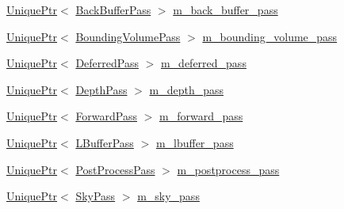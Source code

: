 \begin{DoxyCompactItemize}
\item 
\mbox{\hyperlink{namespacemage_a3316d7143a973e37adf1110f2e80ca31}{Unique\+Ptr}}$<$ \mbox{\hyperlink{classmage_1_1rendering_1_1_back_buffer_pass}{Back\+Buffer\+Pass}} $>$ \mbox{\hyperlink{classmage_1_1rendering_1_1_renderer_1_1_impl_aa030ca4a6167a0dead99172e922ae724}{m\+\_\+back\+\_\+buffer\+\_\+pass}}
\item 
\mbox{\hyperlink{namespacemage_a3316d7143a973e37adf1110f2e80ca31}{Unique\+Ptr}}$<$ \mbox{\hyperlink{classmage_1_1rendering_1_1_bounding_volume_pass}{Bounding\+Volume\+Pass}} $>$ \mbox{\hyperlink{classmage_1_1rendering_1_1_renderer_1_1_impl_adeb573b3a2780e7c8af6fda3e073f90b}{m\+\_\+bounding\+\_\+volume\+\_\+pass}}
\item 
\mbox{\hyperlink{namespacemage_a3316d7143a973e37adf1110f2e80ca31}{Unique\+Ptr}}$<$ \mbox{\hyperlink{classmage_1_1rendering_1_1_deferred_pass}{Deferred\+Pass}} $>$ \mbox{\hyperlink{classmage_1_1rendering_1_1_renderer_1_1_impl_acab2b5fe9403dd1a7643ae91e8a0433d}{m\+\_\+deferred\+\_\+pass}}
\item 
\mbox{\hyperlink{namespacemage_a3316d7143a973e37adf1110f2e80ca31}{Unique\+Ptr}}$<$ \mbox{\hyperlink{classmage_1_1rendering_1_1_depth_pass}{Depth\+Pass}} $>$ \mbox{\hyperlink{classmage_1_1rendering_1_1_renderer_1_1_impl_a6774962f06bc28a23ac7e34d8891bb24}{m\+\_\+depth\+\_\+pass}}
\item 
\mbox{\hyperlink{namespacemage_a3316d7143a973e37adf1110f2e80ca31}{Unique\+Ptr}}$<$ \mbox{\hyperlink{classmage_1_1rendering_1_1_forward_pass}{Forward\+Pass}} $>$ \mbox{\hyperlink{classmage_1_1rendering_1_1_renderer_1_1_impl_aa62d3e015ddcc7b48d423ad0e55a82d7}{m\+\_\+forward\+\_\+pass}}
\item 
\mbox{\hyperlink{namespacemage_a3316d7143a973e37adf1110f2e80ca31}{Unique\+Ptr}}$<$ \mbox{\hyperlink{classmage_1_1rendering_1_1_l_buffer_pass}{L\+Buffer\+Pass}} $>$ \mbox{\hyperlink{classmage_1_1rendering_1_1_renderer_1_1_impl_a82455409a99a11e84de943181138e33e}{m\+\_\+lbuffer\+\_\+pass}}
\item 
\mbox{\hyperlink{namespacemage_a3316d7143a973e37adf1110f2e80ca31}{Unique\+Ptr}}$<$ \mbox{\hyperlink{classmage_1_1rendering_1_1_post_process_pass}{Post\+Process\+Pass}} $>$ \mbox{\hyperlink{classmage_1_1rendering_1_1_renderer_1_1_impl_a243257571f0f32cdc401b73d9b39587c}{m\+\_\+postprocess\+\_\+pass}}
\item 
\mbox{\hyperlink{namespacemage_a3316d7143a973e37adf1110f2e80ca31}{Unique\+Ptr}}$<$ \mbox{\hyperlink{classmage_1_1rendering_1_1_sky_pass}{Sky\+Pass}} $>$ \mbox{\hyperlink{classmage_1_1rendering_1_1_renderer_1_1_impl_afc248fa0b293e9cbd2d0045c4caa7d26}{m\+\_\+sky\+\_\+pass}}

\end{DoxyCompactItemize}
